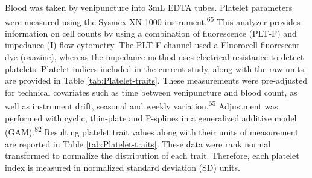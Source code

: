\documentclass[11pt,twoside]{bristolthesis}
\begin{document}
Blood was taken by venipuncture into 3mL EDTA tubes. Platelet parameters were measured using the Sysmex XN-1000 instrument.\textsuperscript{65} This analyzer provides information on cell counts by using a combination of fluorescence (PLT-F) and impedance (I) flow cytometry. The PLT-F channel used a Fluorocell fluorescent dye (oxazine), whereas the impedance method uses electrical resistance to detect platelets. Platelet indices included in the current study, along with the raw units, are provided in Table \ref{tab:Platelet-traits}. These measurements were pre-adjusted for technical covariates such as time between venipuncture and blood count, as well as instrument drift, seasonal and weekly variation.\textsuperscript{65} Adjustment was performed with cyclic, thin-plate and P-splines in a generalized additive model (GAM).\textsuperscript{82} Resulting platelet trait values along with their units of measurement are reported in Table \ref{tab:Platelet-traits}. These data were rank normal transformed to normalize the distribution of each trait. Therefore, each platelet index is measured in normalized standard deviation (SD) units.
\end{document}
